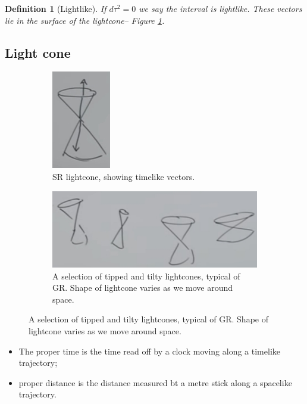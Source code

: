 \documentclass[]{article}
\newtheorem{defn}[thm]{Definition}
\begin{document}
{\begin{defn}[Lightlike]
	If $d\tau^2 =0$ we say the interval is lightlike. These vectors lie in the surface of the lightcone-- Figure \ref{fig:gr-5-timelike}.
\end{defn}

\subsection{Light cone}

\begin{figure}[H]
	\caption{Lightcones}
	\begin{center}
		\begin{subfigure}[t]{0.3\textwidth}
			\caption{SR lightcone, showing timelike vectors.}\label{fig:gr-5-timelike}
			\includegraphics{gr-5-timelike}
		\end{subfigure}
		\;
		\begin{subfigure}[t]{0.65\textwidth}
			\caption{A selection of tipped and tilty lightcones, typical of GR. Shape of lightcone varies as we move around space.}\label{fig:gr-5-tipped-tilty-lightcone}
			\includegraphics[width=\textwidth]{gr-5-tipped-tilty-lightcone}
		\end{subfigure}
	\end{center}
\end{figure}

\begin{itemize}
	\item The proper time is the time read off by a clock moving along a timelike trajectory;
	\item proper distance is the distance measured bt a metre stick along a spacelike trajectory.
\end{itemize} 

}
\end{document}
